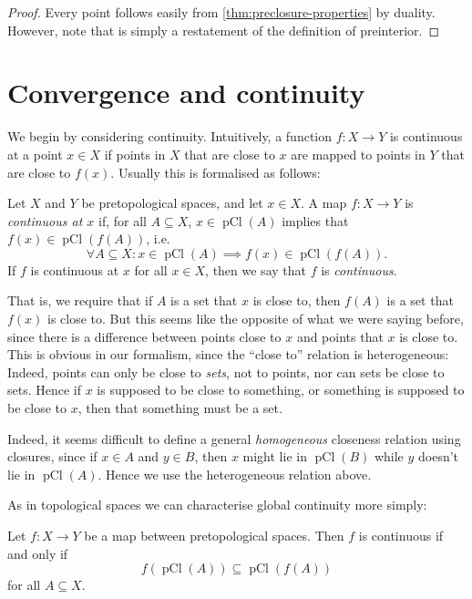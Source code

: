 \documentclass[article, a4paper, 11pt, oneside]{memoir}
\numberwithin{equation}{chapter}
\newcommand{\pCl}[1]{\operatorname{pCl}(#1)}
\begin{document}
\begin{proof}
    Every point follows easily from \cref{thm:preclosure-properties} by duality. However, note that  is simply a restatement of the definition of preinterior.
\end{proof}


\section{Convergence and continuity}

We begin by considering continuity. Intuitively, a function $f \colon X \to Y$ is continuous at a point $x \in X$ if points in $X$ that are close to $x$ are mapped to points in $Y$ that are close to $f(x)$. Usually this is formalised as follows:

\begin{definition}[Continuity]
    \label{def:continuity}
    Let $X$ and $Y$ be pretopological spaces, and let $x \in X$. A map $f \colon X \to Y$ is \emph{continuous at $x$} if, for all $A \subseteq X$, $x \in \pCl{A}$ implies that $f(x) \in \pCl{f(A)}$, i.e.
    \begin{equation*}
        \forall A \subseteq X \colon x \in \pCl{A} \implies f(x) \in \pCl{f(A)}.
    \end{equation*}
    If $f$ is continuous at $x$ for all $x \in X$, then we say that $f$ is \emph{continuous}.
\end{definition}
%
That is, we require that if $A$ is a set that $x$ is close to, then $f(A)$ is a set that $f(x)$ is close to. But this seems like the opposite of what we were saying before, since there is a difference between points close to $x$ and points that $x$ is close to. This is obvious in our formalism, since the \enquote{close to} relation is heterogeneous: Indeed, points can only be close to \emph{sets}, not to points, nor can sets be close to sets. Hence if $x$ is supposed to be close to something, or something is supposed to be close to $x$, then that something must be a set.

Indeed, it seems difficult to define a general \emph{homogeneous} closeness relation using closures, since if $x \in A$ and $y \in B$, then $x$ might lie in $\pCl{B}$ while $y$ doesn't lie in $\pCl{A}$. Hence we use the heterogeneous relation above.

As in topological spaces we can characterise global continuity more simply:

\begin{proposition}
    Let $f \colon X \to Y$ be a map between pretopological spaces. Then $f$ is continuous if and only if
    \begin{equation*}
        f(\pCl{A})
            \subseteq \pCl{f(A)}
    \end{equation*}
    for all $A \subseteq X$.
\end{proposition}
\end{document}
